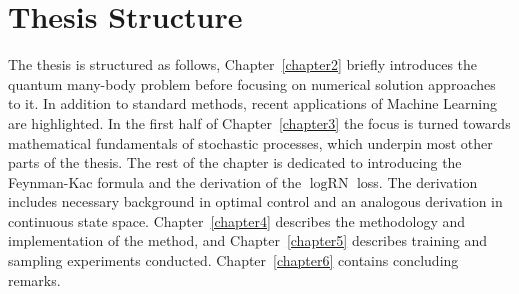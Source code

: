 \section{Thesis Structure}
\label{sec:structure}
The thesis is structured as follows, Chapter~\ref{chapter2} briefly introduces the quantum many-body problem before focusing on numerical solution approaches to it. In addition to standard methods, recent applications of Machine Learning are highlighted. In the first half of Chapter~\ref{chapter3} the focus is turned towards mathematical fundamentals of stochastic processes, which underpin most other parts of the thesis. The rest of the chapter is dedicated to introducing the Feynman-Kac formula and the derivation of the $\log \text{RN}$ loss. The derivation includes necessary background in optimal control and an analogous derivation in continuous state space. Chapter~\ref{chapter4} describes the methodology and implementation of the method, and Chapter~\ref{chapter5} describes training and sampling experiments conducted. Chapter~\ref{chapter6} contains concluding remarks.








